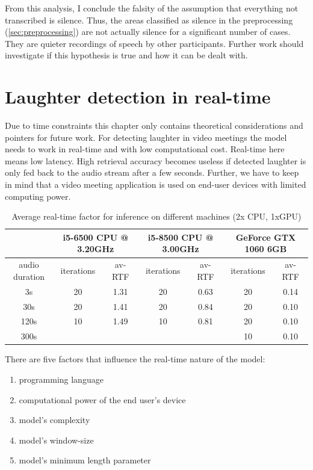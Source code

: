 \documentclass[bsc,frontabs,parskip,deptreport]{infthesis}
\begin{document}
From this analysis, I conclude the falsity of the assumption that everything not transcribed is silence. Thus, the areas classified as silence in the preprocessing (\ref{sec:preprocessing}) are not actually silence for a significant number of cases. They are quieter recordings of speech by other participants. 
Further work should investigate if this hypothesis is true and how it can be dealt with. 



\chapter{Laughter detection in real-time} \label{cha:real-time}
Due to time constraints this chapter only contains theoretical considerations and pointers for future work. 
For detecting laughter in video meetings the model needs to work in real-time and with low computational cost. Real-time here means low latency.
High retrieval accuracy becomes useless if detected laughter is only fed back to the audio stream after a few seconds.
Further, we have to keep in mind that a video meeting application is used on end-user devices with limited computing power. 

\begin{table}[]
    \hspace{-2cm}
    \begin{tabular}{|c|c|c|c|c|c|c|}
    \hline
    & \multicolumn{2}{|c|}{i5-6500 CPU @ 3.20GHz} &
    \multicolumn{2}{|c|}{i5-8500 CPU @ 3.00GHz} & 
    \multicolumn{2}{|c|}{GeForce GTX 1060 6GB} \\ 
    \hline
    audio duration & iterations & av-RTF &
    iterations & av-RTF & iterations & av-RTF \\
    \hline
    3s & 20 & 1.31   & 20 & 0.63  & 20 & 0.14  \\
    30s & 20 & 1.41  & 20 & 0.84  & 20 & 0.10 \\
    120s & 10 & 1.49 &  10 & 0.81  & 20 & 0.10 \\
    300s &&&&                     & 10 & 0.10 \\
    \hline
    \end{tabular}
    \caption{Average real-time factor for inference on different machines (2x CPU, 1xGPU)}
    \label{tab:rtf}
\end{table}


There are five factors that influence the real-time nature of the model:
\begin{enumerate}
    \item programming language
    \item computational power of the end user's device
    \item model's complexity
    \item model's window-size
    \item model's minimum length parameter 
\end{enumerate}
\end{document}
